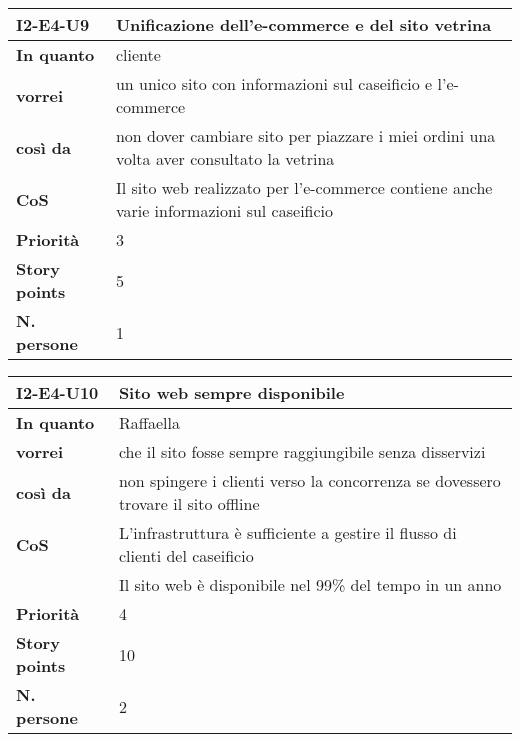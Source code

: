 \begin{table}[H]
  \begin{tabularx}{\textwidth}{lX}
    \toprule
    \textbf{I2-E4-U9} & \textbf{Unificazione dell'e-commerce e del sito vetrina} \\
    \midrule
    \textbf{In quanto} & cliente \\
    \textbf{vorrei} & un unico sito con informazioni sul caseificio e l'e-commerce \\
    \textbf{così da} & non dover cambiare sito per piazzare i miei ordini una volta aver consultato la vetrina \\
    \midrule
    \textbf{CoS} & Il sito web realizzato per l'e-commerce contiene anche varie informazioni sul caseificio \\ 
    \midrule
    \textbf{Priorità} & 3 \\
    \textbf{Story points} & 5 \\
    \textbf{N. persone} & 1 \\
    \bottomrule
  \end{tabularx}
  \label{user-story:i2-e4-u9}
\end{table}

\begin{table}[H]
  \begin{tabularx}{\textwidth}{lX}
    \toprule
    \textbf{I2-E4-U10} & \textbf{Sito web sempre disponibile} \\
    \midrule
    \textbf{In quanto} & Raffaella \\
    \textbf{vorrei} & che il sito fosse sempre raggiungibile senza disservizi \\
    \textbf{così da} & non spingere i clienti verso la concorrenza se dovessero trovare il sito offline \\
    \midrule
    \textbf{CoS} & L'infrastruttura è sufficiente a gestire il flusso di clienti del caseificio \\
    & Il sito web è disponibile nel 99\% del tempo in un anno \\
    \midrule
    \textbf{Priorità} & 4 \\
    \textbf{Story points} & 10 \\
    \textbf{N. persone} & 2 \\
    \bottomrule
  \end{tabularx}
  \label{user-story:i2-e4-u10}
\end{table}


